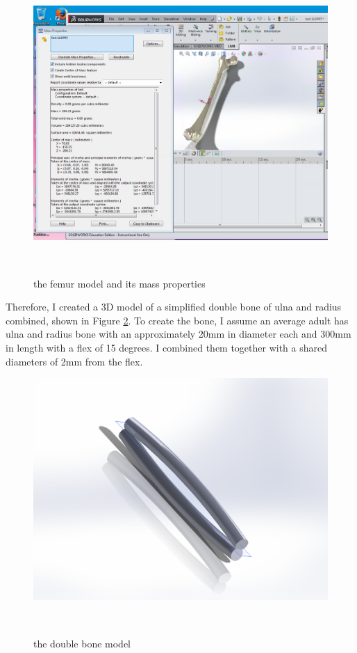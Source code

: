 \documentclass{sigchi}
\begin{document}
\begin{figure}
\centering
  \includegraphics[width=0.9\columnwidth]{figures/femur_property}
  \caption{the femur model and its mass properties }~\label{fig:femur_property}
\end{figure}


Therefore, I created a 3D model of a simplified double bone of ulna and radius combined, shown in Figure \ref{fig:double_bone}. To create the bone, I assume an average adult has ulna and radius bone with an approximately 20mm in diameter each and 300mm in length with a flex of 15 degrees. I combined them together with a shared diameters of 2mm from the flex. 


\begin{figure}
\centering
  \includegraphics[width=0.9\columnwidth]{figures/double_bone}
  \caption{the double bone model}~\label{fig:double_bone}
\end{figure}
\end{document}
